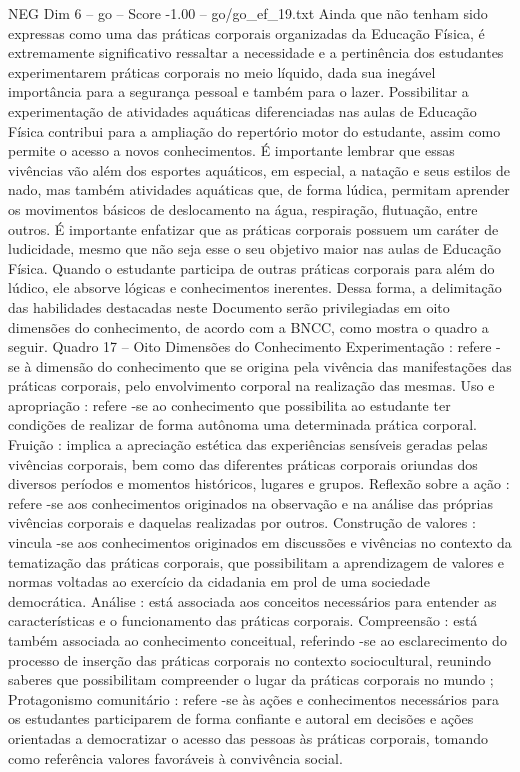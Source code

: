\begin{textsample}{NEG Dim 6 – go – Score -1.00 – go/go\_ef\_19.txt}
Ainda que não tenham sido expressas como uma das práticas corporais organizadas da Educação Física, é extremamente significativo ressaltar a necessidade e a pertinência dos estudantes experimentarem práticas corporais no meio líquido, dada sua inegável importância para a segurança pessoal e também para o lazer.
Possibilitar a experimentação de atividades aquáticas diferenciadas nas aulas de Educação Física contribui para a ampliação do repertório motor do estudante, assim como permite o acesso a novos conhecimentos.
É importante lembrar que essas vivências vão além dos esportes aquáticos, em especial, a natação e seus estilos de nado, mas também atividades aquáticas que, de forma lúdica, permitam aprender os movimentos básicos de deslocamento na água, respiração, flutuação, entre outros.
É importante enfatizar que as práticas corporais possuem um caráter de ludicidade, mesmo que não seja esse o seu objetivo maior nas aulas de Educação Física.
Quando o estudante participa de outras práticas corporais para além do lúdico, ele absorve lógicas e conhecimentos inerentes.
Dessa forma, a delimitação das habilidades destacadas neste Documento serão privilegiadas em oito dimensões do conhecimento, de acordo com a BNCC, como mostra o quadro a seguir.
Quadro 17 – Oito Dimensões do Conhecimento Experimentação : refere -se à dimensão do conhecimento que se origina pela vivência das manifestações das práticas corporais, pelo envolvimento corporal na realização das mesmas.
Uso e apropriação : refere -se ao conhecimento que possibilita ao estudante ter condições de realizar de forma autônoma uma determinada prática corporal.
Fruição : implica a apreciação estética das experiências sensíveis geradas pelas vivências corporais, bem como das diferentes práticas corporais oriundas dos diversos períodos e momentos históricos, lugares e grupos.
Reflexão sobre a ação : refere -se aos conhecimentos originados na observação e na análise das próprias vivências corporais e daquelas realizadas por outros.
Construção de valores : vincula -se aos conhecimentos originados em discussões e vivências no contexto da tematização das práticas corporais, que possibilitam a aprendizagem de valores e normas voltadas ao exercício da cidadania em prol de uma sociedade democrática.
Análise : está associada aos conceitos necessários para entender as características e o funcionamento das práticas corporais.
Compreensão : está também associada ao conhecimento conceitual, referindo -se ao esclarecimento do processo de inserção das práticas corporais no contexto sociocultural, reunindo saberes que possibilitam compreender o lugar da práticas corporais no mundo ; Protagonismo comunitário : refere -se às ações e conhecimentos necessários para os estudantes participarem de forma confiante e autoral em decisões e ações orientadas a democratizar o acesso das pessoas às práticas corporais, tomando como referência valores favoráveis à convivência social.

\end{textsample}

